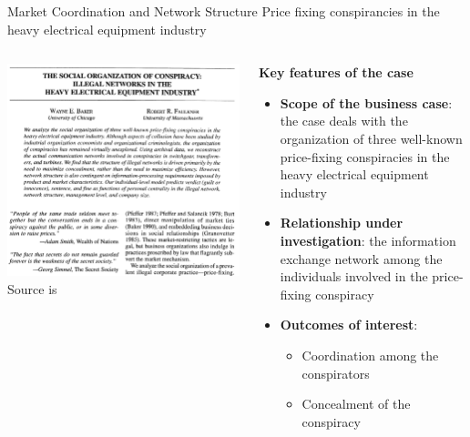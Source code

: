 \documentclass[aspectratio=1610]{beamer}
\begin{document}
\begin{frame}{Market Coordination and Network Structure}
	{Price fixing conspirancies in the heavy electrical equipment industry}
	\centering
	\begin{columns}[c]
		\begin{column}{0.5\textwidth}
			\includegraphics[width=1\textwidth]{images/baker_faulkner.png}
			\small Source is~\cite{baker_faulkner_1993}
		\end{column}
		\begin{column}{0.5\textwidth}
			\begin{center}
			\textbf{Key features of the case}
			\end{center}
			\small
			\begin{itemize}
				\item 
				\textbf{Scope of the business case}: the 
				case deals with the organization of 
				three well-known price-fixing conspiracies in 
				the heavy electrical equipment industry 
				\item
				\textbf{Relationship under investigation}: the 
				information exchange network among the individuals 
				involved in the price-fixing conspiracy 
				\item
				\textbf{Outcomes of interest}:
				\begin{itemize}
					\item Coordination among the conspirators
					\item Concealment of the conspiracy
				\end{itemize}
			\end{itemize}
		\end{column}
	\end{columns}
\end{frame}
\end{document}
